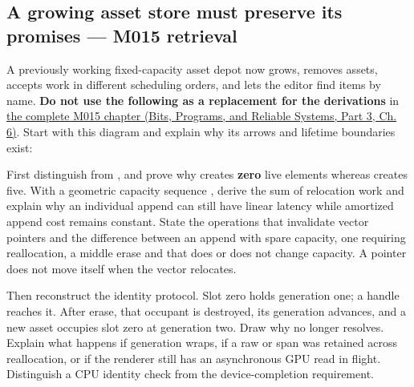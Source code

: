 \subsection{A growing asset store must preserve its promises --- M015 retrieval}\label{appendix-960160274237-a-growing-asset-store-must-preserve-its-promises-m015-retrieval}

\hypertarget{appendix-960160274237-a-growing-asset-store-must-preserve-its-promises-m015-retrieval}{}

A previously working fixed-capacity asset depot now grows, removes assets, accepts work in different scheduling orders, and lets the editor find items by name. \textbf{Do not use the following as a replacement for the derivations} in \href{../01-Bits-Programs-and-Reliable-Systems-P03/main.pdf\#01-foundations-i-ch006-an-asset-registry-grows-while-its-handles-must-not-change}{the complete M015 chapter (Bits, Programs, and Reliable Systems, Part 3, Ch. 6)}. Start with this diagram and explain why its arrows and lifetime boundaries exist:


First distinguish  from , and prove why  creates \textbf{zero} live elements whereas  creates five. With a geometric capacity sequence , derive the sum of relocation work and explain why an individual append can still have linear latency while amortized append cost remains constant. State the operations that invalidate vector pointers and the difference between an append with spare capacity, one requiring reallocation, a middle erase and  that does or does not change capacity. A pointer does not move itself when the vector relocates.

Then reconstruct the identity protocol. Slot zero holds generation one; a handle  reaches it. After erase, that occupant is destroyed, its generation advances, and a new asset occupies slot zero at generation two. Draw why  no longer resolves. Explain what happens if generation wraps, if a raw  or span was retained across reallocation, or if the renderer still has an asynchronous GPU read in flight. Distinguish a CPU identity check from the device-completion requirement.

